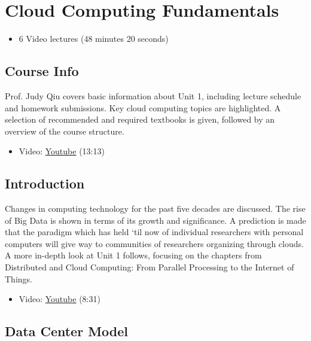 \section{Cloud Computing
Fundamentals}\label{cloud-computing-fundamentals}

\begin{itemize}
\tightlist
\item
  6 Video lectures (48 minutes 20 seconds)
\end{itemize}

\subsection{Course Info}\label{course-info}

Prof. Judy Qiu covers basic information about Unit 1, including lecture
schedule and homework submissions. Key cloud computing topics are
highlighted. A selection of recommended and required textbooks is given,
followed by an overview of the course structure.

\begin{itemize}
\tightlist
\item
  Video: \href{https://www.youtube.com/watch?v=Kde5YVUwDTQ}{Youtube}
  (13:13)
\end{itemize}

\subsection{Introduction}\label{introduction}

Changes in computing technology for the past five decades are discussed.
The rise of Big Data is shown in terms of its growth and significance. A
prediction is made that the paradigm which has held `til now of
individual researchers with personal computers will give way to
communities of researchers organizing through clouds. A more in-depth
look at Unit 1 follows, focusing on the chapters from Distributed and
Cloud Computing: From Parallel Processing to the Internet of Things.

\begin{itemize}
\tightlist
\item
  Video: \href{https://www.youtube.com/watch?v=5lKj8_nqj9k}{Youtube}
  (8:31)
\end{itemize}

\subsection{Data Center Model}\label{data-center-model}

